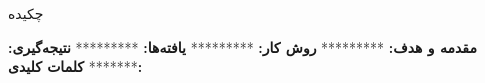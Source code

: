 \ChapterStart
\begin{center}
  {\XTitr\fontsize{16pt}{20pt}\selectfont \ThesisTitleFA\par}
  \vspace{1.2em}
  {\XTitr\fontsize{16pt}{20pt}\selectfont چکیده}
\end{center}
\vspace{1em}
\noindent\textbf{مقدمه و هدف:}
*********
\vspace{0.6em}
\noindent\textbf{روش کار:}
*********
\vspace{0.6em}
\noindent\textbf{یافته‌ها:}
*********
\vspace{0.6em}
\noindent\textbf{نتیجه‌گیری:}
*******
\vspace{1em}
\noindent\textbf{کلمات کلیدی:} \KeywordsFA
\clearpage
